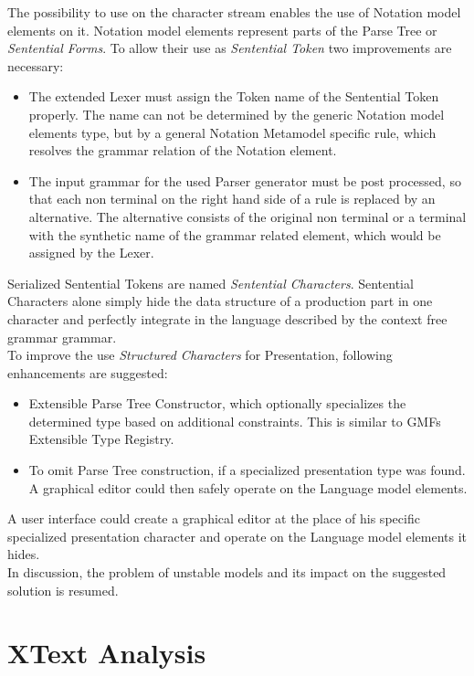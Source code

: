 The possibility to use  on the character stream enables the use of Notation model elements on it. Notation model elements represent parts of the Parse Tree or \emph{Sentential Forms}. To allow their use as \emph{Sentential Token} two improvements are necessary:
\begin{itemize}
	\item The extended Lexer must assign the Token name of the Sentential Token properly. The name can not be determined by the generic Notation model elements type, but by a general Notation Metamodel specific rule, which resolves the grammar relation of the Notation element.
	\item The input grammar for the used Parser generator must be post processed, so that each non terminal on the right hand side of a rule is replaced by an alternative. The alternative consists of the original non terminal or a terminal with the synthetic name of the grammar related element, which would be assigned by the Lexer.
\end{itemize}
Serialized Sentential Tokens are named \emph{Sentential Characters}. Sentential Characters alone simply hide the data structure of a production part in one character and perfectly integrate in the language described by the context free grammar grammar. \\

To improve the use \emph{Structured Characters} for Presentation, following enhancements are suggested:
\begin{itemize}
	\item Extensible Parse Tree Constructor, which optionally specializes the determined type based on additional constraints. This is similar to GMFs Extensible Type Registry.
	\item To omit Parse Tree construction, if a specialized presentation type was found. A graphical editor could then safely operate on the Language model elements.
\end{itemize}
A user interface could create a graphical editor at the place of his specific specialized presentation character and operate on the Language model elements it hides.\\


In discussion, the problem of unstable models and its impact on the suggested solution is resumed.


\section{XText Analysis}
